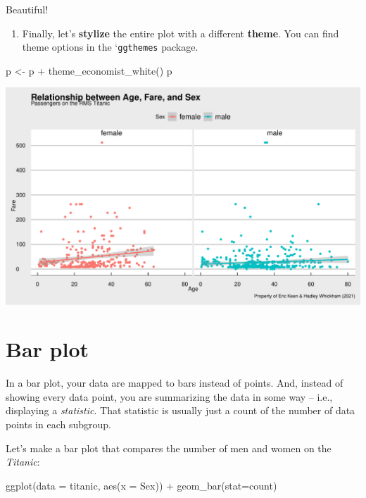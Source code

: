 \documentclass[
]{book}
\newenvironment{Shaded}{\begin{snugshade}}{\end{snugshade}}
\newcommand{\AttributeTok}[1]{\textcolor[rgb]{0.77,0.63,0.00}{#1}}
\newcommand{\FunctionTok}[1]{\textcolor[rgb]{0.00,0.00,0.00}{#1}}
\newcommand{\NormalTok}[1]{#1}
\newcommand{\OtherTok}[1]{\textcolor[rgb]{0.56,0.35,0.01}{#1}}
\newcommand{\SpecialCharTok}[1]{\textcolor[rgb]{0.00,0.00,0.00}{#1}}
\newcommand{\StringTok}[1]{\textcolor[rgb]{0.31,0.60,0.02}{#1}}
\providecommand{\tightlist}{%
  \setlength{\itemsep}{0pt}\setlength{\parskip}{0pt}}
\begin{document}
Beautiful!

\begin{enumerate}
\def\labelenumi{(\arabic{enumi})}
\setcounter{enumi}{7}
\tightlist
\item
  Finally, let's \textbf{stylize} the entire plot with a different \textbf{theme}. You can find theme options in the `\texttt{ggthemes} package.
\end{enumerate}

\begin{Shaded}
\begin{Highlighting}[]
\NormalTok{p }\OtherTok{\textless{}{-}}\NormalTok{ p }\SpecialCharTok{+} \FunctionTok{theme\_economist\_white}\NormalTok{()}
\NormalTok{p}
\end{Highlighting}
\end{Shaded}

\includegraphics{figures/unnamed-chunk-161-1.pdf}

\hypertarget{bar-plot}{%
\section*{Bar plot}\label{bar-plot}}

In a bar plot, your data are mapped to bars instead of points. And, instead of showing every data point, you are summarizing the data in some way -- i.e., displaying a \emph{statistic}. That statistic is usually just a count of the number of data points in each subgroup.

Let's make a bar plot that compares the number of men and women on the \emph{Titanic}:

\begin{Shaded}
\begin{Highlighting}[]
\FunctionTok{ggplot}\NormalTok{(}\AttributeTok{data =}\NormalTok{ titanic, }
       \FunctionTok{aes}\NormalTok{(}\AttributeTok{x =}\NormalTok{ Sex)) }\SpecialCharTok{+} 
  \FunctionTok{geom\_bar}\NormalTok{(}\AttributeTok{stat=}\StringTok{\textquotesingle{}count\textquotesingle{}}\NormalTok{)}
\end{Highlighting}
\end{Shaded}
\end{document}

